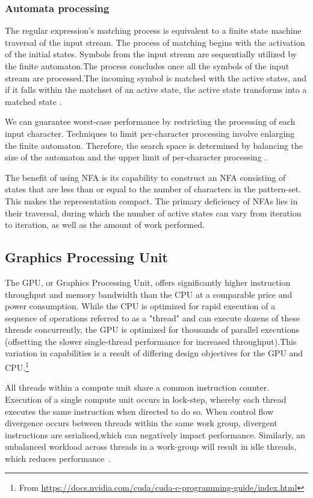 \documentclass[10pt,onecolumn,twoside,english,a4paper]{article}
\begin{document}
\subsubsection{Automata processing} \label{Automata processing}
The regular expression's matching process is equivalent to a finite state machine traversal of the input stream.
The process of matching begins with the activation of the initial states. Symbols from the input stream are sequentially utilized by the finite automaton.The process concludes once all the symbols of the input stream are processed.The incoming symbol is matched with the active states, and if it falls within the matchset of an active state, the active state transforms into a matched state \cite{Liu:Asynchronous}.

We can guarantee worst-case performance by restricting the processing of each input character. Techniques to limit per-character processing involve enlarging the finite automaton. Therefore, the search space is determined by balancing the size of the automaton and the upper limit of per-character processing \cite{Nourian:DemystifyingFSA}.

The benefit of using NFA is its capability to construct an NFA consisting of states that are less than or equal to the number of characters in the pattern-set. This makes the representation compact. The primary deficiency of NFAs lies in their traversal, during which the number of active states can vary from iteration to iteration, as well as the amount of work performed\cite{Becchi:regex_large_dataset}.

\subsection{Graphics Processing Unit} \label{GPU}
The GPU, or Graphics Processing Unit, offers significantly higher instruction throughput and memory bandwidth than the CPU at a comparable price and power consumption.
While the CPU is optimized for rapid execution of a sequence of operations referred to as a "thread" and can execute dozens of these threads concurrently, the GPU is optimized for thousands of parallel executions (offsetting the slower single-thread performance for increased throughput).This variation in capabilities is a result of differing design objectives for the GPU and CPU.\footnote{From \url{https://docs.nvidia.com/cuda/cuda-c-programming-guide/index.html}}

All threads within a compute unit share a common instruction counter. Execution of a single compute unit occurs in lock-step, whereby each thread executes the same instruction when directed to do so. When control flow divergence occurs between threads within the same work group, divergent instructions are serialised,which can negatively impact performance.
Similarly, an unbalanced workload across threads in a work-group will result in idle threads, which reduces performance~\cite{yaneva2022gpuaccelerationFSA}.
\end{document}
